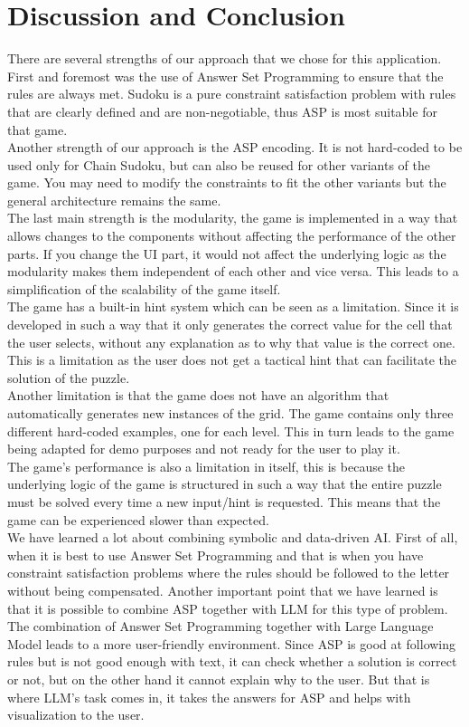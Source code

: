 \documentclass[11pt]{article}
\begin{document}
\section{Discussion and Conclusion}
There are several strengths of our approach that we chose for this application. First and foremost was the use of Answer Set Programming to ensure that the rules are always met. Sudoku is a pure constraint satisfaction problem with rules that are clearly defined and are non-negotiable, thus ASP is most suitable for that game.
\\ Another strength of our approach is the ASP encoding. It is not hard-coded to be used only for Chain Sudoku, but can also be reused for other variants of the game. You may need to modify the constraints to fit the other variants but the general architecture remains the same.
\\ The last main strength is the modularity, the game is implemented in a way that allows changes to the components without affecting the performance of the other parts. If you change the UI part, it would not affect the underlying logic as the modularity makes them independent of each other and vice versa. This leads to a simplification of the scalability of the game itself. \\
\linebreak The game has a built-in hint system which can be seen as a limitation. Since it is developed in such a way that it only generates the correct value for the cell that the user selects, without any explanation as to why that value is the correct one. This is a limitation as the user does not get a tactical hint that can facilitate the solution of the puzzle.
\\ Another limitation is that the game does not have an algorithm that automatically generates new instances of the grid. The game contains only three different hard-coded examples, one for each level. This in turn leads to the game being adapted for demo purposes and not ready for the user to play it.
\\ The game's performance is also a limitation in itself, this is because the underlying logic of the game is structured in such a way that the entire puzzle must be solved every time a new input/hint is requested. This means that the game can be experienced slower than expected. \\
\linebreak
We have learned a lot about combining symbolic and data-driven AI. First of all, when it is best to use Answer Set Programming and that is when you have constraint satisfaction problems where the rules should be followed to the letter without being compensated. Another important point that we have learned is that it is possible to combine ASP together with LLM for this type of problem. The combination of Answer Set Programming together with Large Language Model leads to a more user-friendly environment. Since ASP is good at following rules but is not good enough with text, it can check whether a solution is correct or not, but on the other hand it cannot explain why to the user. But that is where LLM's task comes in, it takes the answers for ASP and helps with visualization to the user. \\
\end{document}
